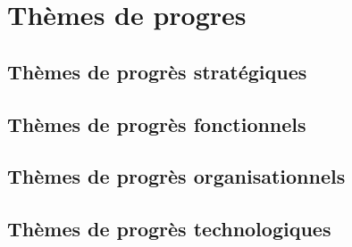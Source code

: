 \chapter{Th\`emes de progres}

\section{Th\`emes de progr\`es strat\'egiques}

\section{Th\`emes de progr\`es fonctionnels}

\section{Th\`emes de progr\`es organisationnels}

\section{Th\`emes de progr\`es technologiques}

